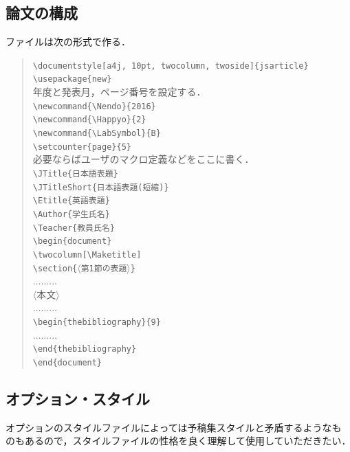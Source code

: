 \documentclass[a4j, 9pt, twocolumn, twoside]{jsarticle}
\begin{document}
\subsection{論文の構成}\label{sec:config}
ファイルは次の形式で作る．
\begin{quote}\small
\texttt{\textbackslash documentstyle[a4j, 10pt, twocolumn, twoside]\{jsarticle\}}\\
\texttt{\textbackslash usepackage\{new\}}\\
年度と発表月，ページ番号を設定する．\\
\texttt{\textbackslash newcommand\{\textbackslash Nendo\}\{2016\}}\\
\texttt{\textbackslash newcommand\{\textbackslash Happyo\}\{2\}}\\
\texttt{\textbackslash newcommand\{\textbackslash LabSymbol\}\{B\}}\\
\texttt{\textbackslash setcounter\{page\}\{5\}}\\
必要ならばユーザのマクロ定義などをここに書く．\\
\texttt{\textbackslash JTitle\{日本語表題\}}\\
\texttt{\textbackslash JTitleShort\{日本語表題(短縮)\}}\\
\texttt{\textbackslash Etitle\{英語表題\}}\\
\texttt{\textbackslash Author\{学生氏名\}}\\
\texttt{\textbackslash Teacher\{教員氏名\}}\\
\texttt{\textbackslash begin\{document\}}\\
\texttt{\textbackslash twocolumn[\textbackslash Maketitle]}\\
\texttt{\textbackslash section\{$\langle$第1節の表題$\rangle$\}}\\
\quad $\ldots\ldots\ldots$\\
\quad$\langle$本文$\rangle$\\
\quad $\ldots\ldots\ldots$\\
\texttt{\textbackslash begin\{thebibliography\}\{9\}}\\
\quad $\ldots\ldots\ldots$\\
\texttt{\textbackslash end\{thebibliography\}}\\
\texttt{\textbackslash end\{document\}}
\end{quote}

\subsection{オプション・スタイル}
オプションのスタイルファイルによっては予稿集スタイルと矛盾するようなも
のもあるので，スタイルファイルの性格を良く理解して使用していただきたい．
\end{document}
